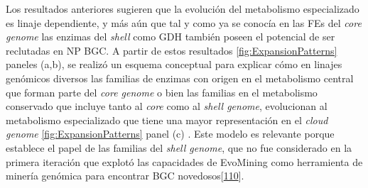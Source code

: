 \documentclass[12pt,twoside]{reedthesis}
\begin{document}
  Los resultados anteriores sugieren que la evolución del metabolismo
  especializado es linaje dependiente, y más aún que tal y como ya se
  conocía en las FEs del \emph{core genome} las enzimas del \emph{shell}
  como GDH también poseen el potencial de ser reclutadas en NP BGC. A
  partir de estos resultados \autoref{fig:ExpansionPatterns} paneles
  (a,b), se realizó un esquema conceptual para explicar cómo en linajes
  genómicos diversos las familias de enzimas con origen en el metabolismo
  central que forman parte del \emph{core genome} o bien las familias en
  el metabolismo conservado que incluye tanto al \emph{core} como al
  \emph{shell genome}, evolucionan al metabolismo especializado que tiene
  una mayor representación en el \emph{cloud genome}
  \autoref{fig:ExpansionPatterns} panel (c) . Este modelo es relevante
  porque establece el papel de las familias del \emph{shell genome}, que
  no fue considerado en la primera iteración que explotó las capacidades
  de EvoMining como herramienta de minería genómica para encontrar BGC
  novedosos{[}\protect\hyperlink{ref-navarro-munoz_computational_2018}{110}{]}.
  
\end{document}
